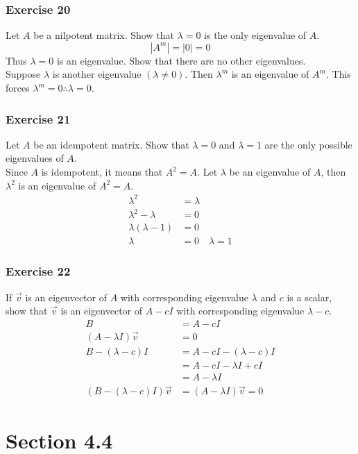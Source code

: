 \documentclass{math}
\begin{document}
\subsubsection*{Exercise 20}
Let \( A \) be a nilpotent matrix. Show that \( \lambda = 0 \) is the only
eigenvalue of \( A \).
\[ |A^m| = |0| = 0 \]
Thus \( \lambda = 0 \) is an eigenvalue. Show that there are no other
eigenvalues. \\
Suppose \( \lambda \) is another eigenvalue \( (\lambda\ne0) \).
Then \( \lambda^m \) is an eigenvalue of \( A^m \). This forces \( \lambda^m =
0 \therefore \lambda = 0 \).

\subsubsection*{Exercise 21}
Let \( A \) be an idempotent matrix. Show that \( \lambda = 0 \) and
\( \lambda = 1 \) are the only possible eigenvalues of \( A \). \\
Since \( A \) is idempotent, it means that \( A^2 = A \). Let \( \lambda \) be
an eigenvalue of \( A \), then \( \lambda^2 \) is an eigenvalue of
\( A^2 = A \).
\begin{align*}
  \lambda^2 &= \lambda \\
  \lambda^2-\lambda &= 0 \\
  \lambda(\lambda-1) &= 0 \\
  \lambda &= 0 \quad \lambda = 1
\end{align*}

\subsubsection*{Exercise 22}
If \( \vec{v} \) is an eigenvector of \( A \) with corresponding eigenvalue
\( \lambda \) and \( c \) is a scalar, show that \( \vec{v} \) is an eigenvector
of \( A-cI \) with corresponding eigenvalue \( \lambda-c \).
\begin{align*}
  B &= A-cI \\
  (A-\lambda I)\vec{v} &= 0 \\
  B-(\lambda-c)I &= A-cI-(\lambda-c)I \\
  &= A-cI-\lambda I+cI \\
  &= A-\lambda I \\
  (B-(\lambda-c)I)\vec{v} &= (A-\lambda I)\vec{v} = 0
\end{align*}

\section*{Section 4.4}
\end{document}
